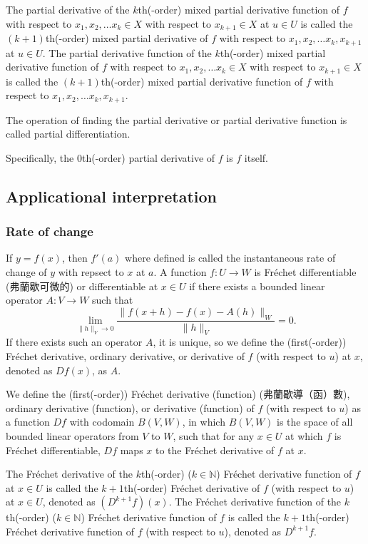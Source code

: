 \documentclass[a4paper,12pt]{report}
\begin{document}
\begin{itemize}
\begin{itemize}
The partial derivative of the $k$th(-order) mixed partial derivative function of $f$ with respect to $ x_1, x_2,\dots  x_k\in X$ with respect to $ x_{k+1}\in X$ at $u\in U$ is called the $(k+1)$th(-order) mixed partial derivative of $f$ with respect to $ x_1, x_2,\dots  x_k, x_{k+1}$ at $u\in U$. The partial derivative function of the $k$th(-order) mixed partial derivative function of $f$ with respect to $ x_1, x_2,\dots  x_k\in X$ with respect to $ x_{k+1}\in X$ is called the $(k+1)$th(-order) mixed partial derivative function of $f$ with respect to $ x_1, x_2,\dots  x_k, x_{k+1}$.

The operation of finding the partial derivative or partial derivative function is called partial differentiation.

Specifically, the $0$th(-order) partial derivative of $f$ is $f$ itself.
\subsection{Applicational interpretation}
\subsubsection{Rate of change}
If $y=f(x)$, then $f'(a)$ where defined is called the instantaneous rate of change of $y$ with repsect to $x$ at $a$.
A function $f\colon U\to W$ is Fréchet differentiable (弗蘭歇可微的) or differentiable at $x\in U$ if there exists a bounded linear operator $A\colon V\to W$ such that
\[\lim_{\|h\|_V\to 0}\frac{\|f(x+h)-f(x)-A(h)\|_W}{\|h\|_V}=0.\]
If there exists such an operator $A$, it is unique, so we define the (first(-order)) Fréchet derivative, ordinary derivative, or derivative of $f$ (with respect to $u$) at $x$, denoted as $Df(x)$, as $A$.

We define the (first(-order)) Fréchet derivative (function) (弗蘭歇導（函）數), ordinary derivative (function), or derivative (function) of $f$ (with respect to $u$) as a function $Df$ with codomain $B(V,W)$, in which $B(V,W)$ is the space of all bounded linear operators from $V$ to $W$, such that for any $x\in U$ at which $f$ is Fréchet differentiable, $Df$ maps $x$ to the Fréchet derivative of $f$ at $x$.

The Fréchet derivative of the $k$th(-order) ($k\in\mathbb{N}$) Fréchet derivative function of $f$ at $x\in U$ is called the $k+1$th(-order) Fréchet derivative of $f$ (with respect to $u$) at $x\in U$, denoted as $(D^{k+1}f)(x)$. The Fréchet derivative function of the $k$th(-order) ($k\in\mathbb{N}$) Fréchet derivative function of $f$ is called the $k+1$th(-order) Fréchet derivative function of $f$ (with respect to $u$), denoted as $D^{k+1}f$.


\end{itemize}
\end{itemize}
\end{document}

